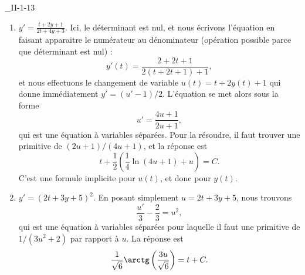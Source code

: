 \begin{corrige}{_II-1-13}
\begin{enumerate}
\item $y'=\frac{ t+2y+1 }{ 2t+4y+3 }$.
Ici, le déterminant est nul, et nous écrivons l'équation en faisant apparaitre le numérateur au dénominateur (opération possible parce que déterminant est nul) :
\begin{equation}
	y'(t)=\frac{ 2+2t+1 }{ 2(t+2t+1)+1 },
\end{equation}
et nous effectuons le changement de variable $u(t)=t+2y(t)+1$ qui donne immédiatement $y'=(u'-1)/2$. L'équation se met alors sous la forme
\begin{equation}
	u'=\frac{ 4u+1 }{ 2u+1 },
\end{equation}
qui est une équation à variables séparées. Pour la résoudre, il faut trouver une primitive de $(2u+1)/(4u+1)$, et la réponse est
\begin{equation}
	t+\frac{1}{ 2 }\left( \frac{1}{ 4 }\ln(4u+1)+u \right)=C.
\end{equation}
C'est une formule implicite pour $u(t)$, et donc pour $y(t)$.


\item $y'=(2t+3y+5)^2$.
En posant simplement $u=2t+3y+5$, nous trouvons 
\begin{equation}
	\frac{ u' }{ 3 }-\frac{ 2 }{ 3 }=u^2,
\end{equation}
qui est une équation à variables séparées pour laquelle il faut une primitive de $1/(3u^2+2)$ par rapport à $u$. La réponse est
\begin{equation}
	\frac{1}{ \sqrt{6} }\arctg\left( \frac{ 3u }{ \sqrt{6} } \right)=t+C.
\end{equation}



\end{enumerate}

\end{corrige}

